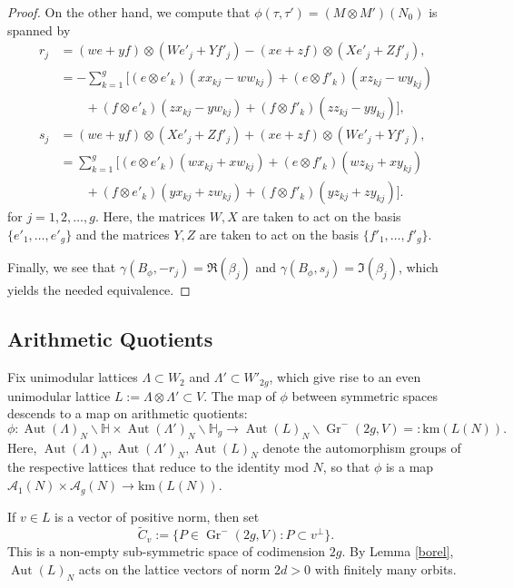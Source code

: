 \documentclass[12pt]{amsart}
\def\cA{\mathcal{A}}
\def\bH{\mathbb{H}}
\def\wt{\widetilde}
\DeclareMathOperator{\Aut}{Aut}
\DeclareMathOperator{\Gr}{Gr}
\newcommand{\km}{\mathrm{km}}
\theoremstyle{definition}
\begin{document}
\begin{proof}
On the other hand, we compute that $\phi(\tau,\tau')=(M\otimes M')(N_0)$ is spanned by
\begin{align*}
    r_j&=(we+yf)\otimes(We'_j+Yf'_j)-(xe+zf)\otimes(Xe'_j+Zf'_j),\\
    &=-\sum_{k=1}^g [(e\otimes e'_k)(xx_{kj}-ww_{kj})+(e\otimes f'_k)(xz_{kj}-wy_{kj})\\
    &\quad\quad+(f\otimes e'_k)(zx_{kj}-yw_{kj})+(f\otimes f'_k)(zz_{kj}-yy_{kj})],\\
    s_j&=(we+yf)\otimes(Xe'_j+Zf'_j)+(xe+zf)\otimes(We'_j+Yf'_j),\\
    &=\sum_{k=1}^g [(e\otimes e'_k)(wx_{kj}+xw_{kj})+(e\otimes f'_k)(wz_{kj}+xy_{kj})\\
    &\quad\quad+(f\otimes e'_k)(yx_{kj}+zw_{kj})+(f\otimes f'_k)(yz_{kj}+zy_{kj})].
\end{align*}
for $j=1,2,\ldots,g$. Here, the matrices $W,X$ are taken to act on the basis $\{e'_1,\ldots,e'_g\}$ and the matrices $Y,Z$ are taken to act on the basis $\{f'_1,\ldots,f'_g\}$.

Finally, we see that $\gamma(B_\phi,-r_j)=\Re(\beta_j)$ and $\gamma(B_\phi,s_j)=\Im(\beta_j)$, which yields the needed equivalence.
\end{proof}

\subsection{Arithmetic Quotients}
Fix unimodular lattices $\Lambda\subset W_2$ and $\Lambda' \subset W'_{2g}$, which give rise to an even unimodular lattice $L:=\Lambda\otimes \Lambda' \subset V$. The map of $\phi$ between symmetric spaces descends to a map on arithmetic quotients: 
\begin{equation*}
\phi:\Aut(\Lambda)_N \backslash \bH \times \Aut(\Lambda')_N\backslash \bH_g \to \Aut(L)_N\backslash \Gr^-(2g,V)=:\km(L(N)).
\end{equation*}
Here, $\Aut(\Lambda)_N,\Aut(\Lambda')_N,\Aut(L)_N$ denote the automorphism groups of the respective lattices that reduce to the identity mod $N$, so that $\phi$ is a map $\cA_1(N)\times\cA_g(N)\to\km(L(N))$.

If $v\in L$ is a vector of positive norm, then set
\begin{equation*}
\wt{C}_v := \{P\in \Gr^-(2g,V): P\subset v^\perp\}.
\end{equation*}
This is a non-empty sub-symmetric space of codimension $2g$. By Lemma \ref{borel}, $\Aut(L)_N$ acts on the lattice vectors of norm $2d>0$ with finitely many orbits. 
\end{document}
